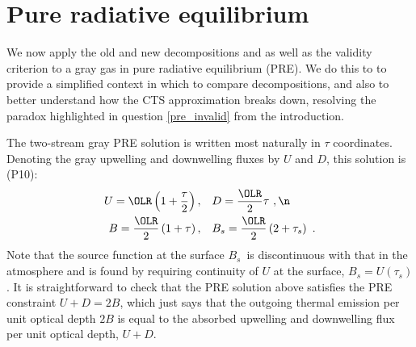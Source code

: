 \documentclass[10pt]{article}
\newcommand{\taus}{\ensuremath{\tau_s}}
\newcommand{\Bs}{\ensuremath{B_s}}
\begin{document}
\section{Pure radiative equilibrium} \label{sec_pre}
We now apply the old and new decompositions  and  as well as the validity criterion  to a gray gas in pure radiative equilibrium (PRE). We do this to to provide a simplified context in which to compare decompositions, and also to better understand how the CTS approximation breaks down, resolving the paradox highlighted in question \ref{pre_invalid} from the introduction.

The two-stream gray PRE solution is written most naturally in $\tau$ coordinates. Denoting the gray upwelling and downwelling fluxes by $U$ and  $D$, this solution is (P10): 
	\begin{align}
		U  =  \OLR\left(1+\frac{\tau}{2}\right), & \quad D =  \frac{\OLR}{2}\tau\ , \n \\
		B  =  \frac{\OLR}{2}\left(1+\tau \right) , &\quad  \Bs= \frac{\OLR}{2}\left(2+\taus\right) \ . \label{B_pre}
	\end{align}
Note that the source function at the surface \Bs\ is discontinuous with that in the atmosphere and is found by requiring continuity of $U$ at the surface, $\Bs = U(\taus)$. It is straightforward to check that the PRE solution above  satisfies the PRE constraint $U+D=2B$, which just says that the outgoing thermal emission per unit optical depth $2B$ is equal to the absorbed upwelling and downwelling flux per unit optical depth, $U+D$. 
\end{document}
